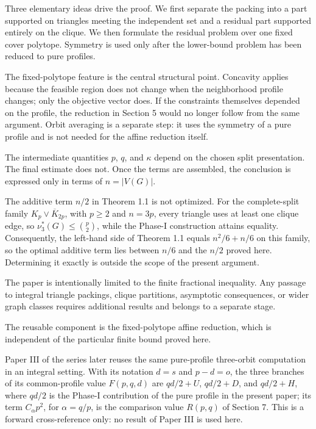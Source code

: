\documentclass[
  american,
  11pt,
  a4paper,
]{article}
\begin{document}
Three elementary ideas drive the proof. We first separate the packing into a part supported on triangles meeting the independent set and a residual part supported entirely on the clique. We then formulate the residual problem over one fixed cover polytope. Symmetry is used only after the lower-bound problem has been reduced to pure profiles.

The fixed-polytope feature is the central structural point. Concavity applies because the feasible region does not change when the neighborhood profile changes; only the objective vector does. If the constraints themselves depended on the profile, the reduction in Section 5 would no longer follow from the same argument. Orbit averaging is a separate step: it uses the symmetry of a pure profile and is not needed for the affine reduction itself.

The intermediate quantities \(p\), \(q\), and \(\kappa\) depend on the chosen split presentation. The final estimate does not. Once the terms are assembled, the conclusion is expressed only in terms of \(n=|V(G)|\).

The additive term \(n/2\) in Theorem 1.1 is not optimized. For the complete-split family \(K_p\vee\overline{K}_{2p}\), with \(p\ge2\) and \(n=3p\), every triangle uses at least one clique edge, so \(\nu_3^*(G)\le\binom p2\), while the Phase-I construction attains equality. Consequently, the left-hand side of Theorem 1.1 equals \(n^2/6+n/6\) on this family, so the optimal additive term lies between \(n/6\) and the \(n/2\) proved here. Determining it exactly is outside the scope of the present argument.

The paper is intentionally limited to the finite fractional inequality. Any passage to integral triangle packings, clique partitions, asymptotic consequences, or wider graph classes requires additional results and belongs to a separate stage.

The reusable component is the fixed-polytope affine reduction, which is independent of the particular finite bound proved here.

Paper III of the series later reuses the same pure-profile three-orbit computation in an integral setting. With its notation \(d=s\) and \(p-d=o\), the three branches of its common-profile value \(F(p,q,d)\) are \(qd/2+U\), \(qd/2+D\), and \(qd/2+H\), where \(qd/2\) is the Phase-I contribution of the pure profile in the present paper; its term \(C_\alpha p^2\), for \(\alpha=q/p\), is the comparison value \(R(p,q)\) of Section 7. This is a forward cross-reference only: no result of Paper III is used here.
\end{document}
